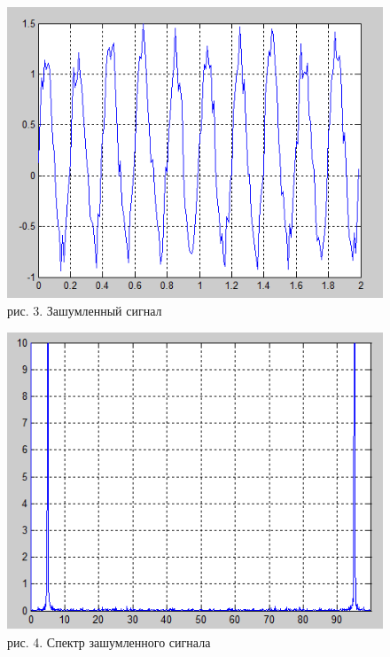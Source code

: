 \documentclass[10pt,a4paper]{report}
\begin{document}
\begin{figure}
\begin{center}
\includegraphics[angle=0, scale = 0.9]{3.png}\newline
рис. 3. Зашумленный сигнал\newline
\end{center}
\begin{center}
\includegraphics[angle=0, scale = 0.9]{4.png}\newline
рис. 4. Спектр зашумленного сигнала\newline
\end{center}
\end{figure}
\end{document}
